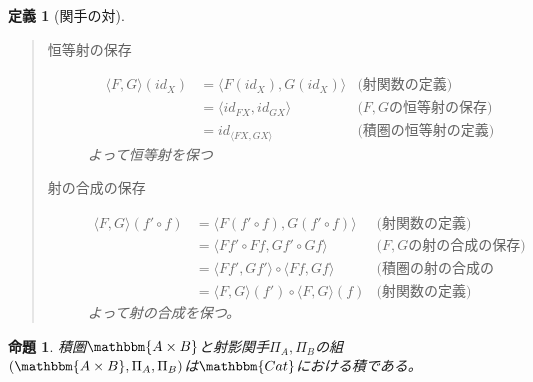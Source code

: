 \documentclass[dvipdfmx]{jsarticle}
\newcommand{\cat}[1]{\mathbbm{#1}}
\newcommand{\tuple}[1]{\langle #1\rangle}
\newtheorem{prop}{命題}[section]
\newtheorem{define}{定義}[section]
\numberwithin{proof}{subsection}
\numberwithin{prop}{subsection}
\numberwithin{define}{subsection}
\begin{document}
\begin{define}[関手の対]
\begin{quote}
\begin{description}
				\begin{center}
				\end{center}
				\item[恒等射の保存]
				\begin{align*}
					\tuple{F,G}(id_X)&=\tuple{F(id_X),G(id_X)}&\text{(射関数の定義)}\\
					&=\tuple{id_{FX},id_{GX}}&\text{($F,G$の恒等射の保存)}\\
					&=id_{\tuple{FX,GX}}&\text{(積圏の恒等射の定義)}
				\end{align*}
			よって恒等射を保つ
				\item[射の合成の保存]
				\begin{align*}
					\tuple{F,G}(f'\circ f)&=\tuple{F(f'\circ f),G(f'\circ f)}&\text{(射関数の定義)}\\
					&=\tuple{Ff'\circ Ff, Gf'\circ Gf}&\text{($F,G$の射の合成の保存)}\\
					&=\tuple{Ff',Gf'}\circ\tuple{Ff,Gf}&\text{(積圏の射の合成の定義)}\\
					&=\tuple{F,G}(f')\circ\tuple{F,G}(f)&\text{(射関数の定義)}
				\end{align*}
			よって射の合成を保つ。
			\end{description}
		\end{quote}
	\end{define}
	\begin{prop}
		積圏$\cat{A\times B}$と射影関手$\Pi_A,\Pi_B$の組$(\cat{A\times B},\Pi_A,\Pi_B)$は$\cat{Cat}$における積である。
	\end{prop}
\end{document}
